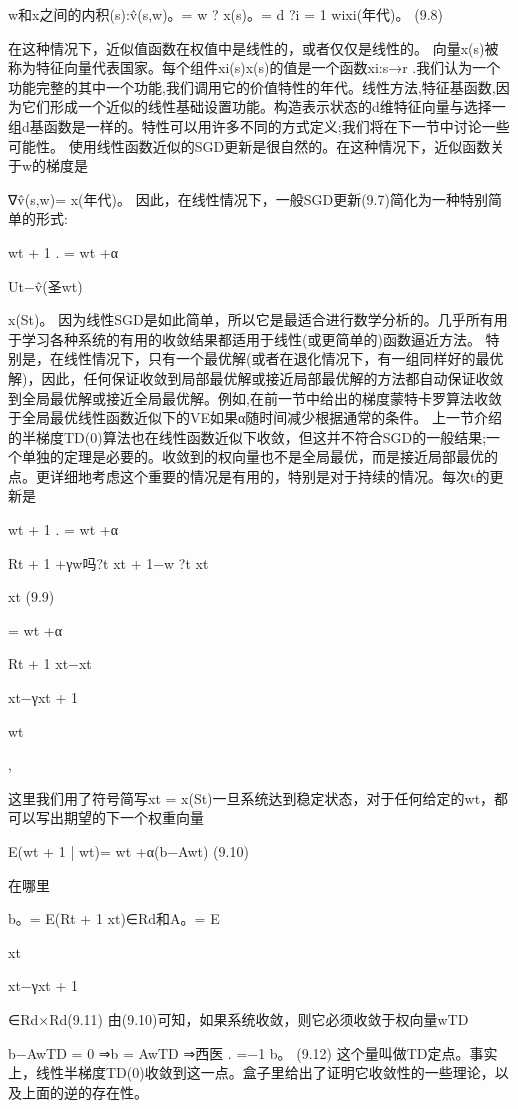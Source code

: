 w和x之间的内积(s):v̂(s,w)。= w ? x(s)。=
d ?i = 1
wixi(年代)。 					(9.8)

在这种情况下，近似值函数在权值中是线性的，或者仅仅是线性的。
向量x(s)被称为特征向量代表国家。每个组件xi(s)x(s)的值是一个函数xi:s→r .我们认为一个功能完整的其中一个功能,我们调用它的价值特性的年代。线性方法,特征基函数,因为它们形成一个近似的线性基础设置功能。构造表示状态的d维特征向量与选择一组d基函数是一样的。特性可以用许多不同的方式定义;我们将在下一节中讨论一些可能性。
使用线性函数近似的SGD更新是很自然的。在这种情况下，近似函数关于w的梯度是

∇v̂(s,w)= x(年代)。
因此，在线性情况下，一般SGD更新(9.7)简化为一种特别简单的形式:

wt + 1
.
= wt +α

Ut−v̂(圣wt)

x(St)。
因为线性SGD是如此简单，所以它是最适合进行数学分析的。几乎所有用于学习各种系统的有用的收敛结果都适用于线性(或更简单的)函数逼近方法。
特别是，在线性情况下，只有一个最优解(或者在退化情况下，有一组同样好的最优解)，因此，任何保证收敛到局部最优解或接近局部最优解的方法都自动保证收敛到全局最优解或接近全局最优解。例如,在前一节中给出的梯度蒙特卡罗算法收敛于全局最优线性函数近似下的VE如果α随时间减少根据通常的条件。
上一节介绍的半梯度TD(0)算法也在线性函数近似下收敛，但这并不符合SGD的一般结果;一个单独的定理是必要的。收敛到的权向量也不是全局最优，而是接近局部最优的点。更详细地考虑这个重要的情况是有用的，特别是对于持续的情况。每次t的更新是

wt + 1
.
= wt +α

Rt + 1 +γw吗?t xt + 1−w ?t xt

xt 					(9.9)

= wt +α

Rt + 1 xt−xt

xt−γxt + 1

wt

,



这里我们用了符号简写xt = x(St)一旦系统达到稳定状态，对于任何给定的wt，都可以写出期望的下一个权重向量

E(wt + 1 | wt)= wt +α(b−Awt) 					(9.10)

在哪里

b。= E(Rt + 1 xt)∈Rd和A。= E

xt

xt−γxt + 1

∈Rd×Rd(9.11)
由(9.10)可知，如果系统收敛，则它必须收敛于权向量wTD

b−AwTD = 0
⇒b = AwTD
⇒西医
.
=−1 b。 					(9.12)
这个量叫做TD定点。事实上，线性半梯度TD(0)收敛到这一点。盒子里给出了证明它收敛性的一些理论，以及上面的逆的存在性。
 
